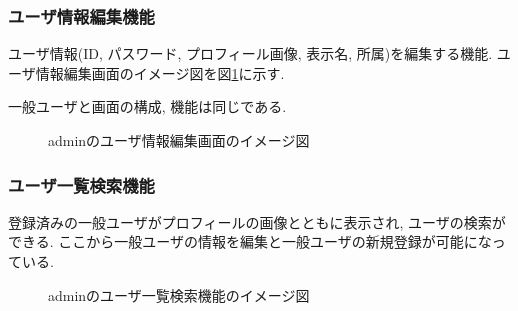 \documentclass[11ptm]{jsarticle}
\begin{document}
\clearpage
\subsubsection{ユーザ情報編集機能}
\label{subsubsec:ユーザ情報編集機能(admin)}
ユーザ情報(ID, パスワード, プロフィール画像, 表示名, 所属)を編集する機能. ユーザ情報編集画面のイメージ図を図\ref{fig:adminのユーザ情報編集画面のイメージ図}に示す. \par
一般ユーザと画面の構成, 機能は同じである.
\begin{figure}[h]
  \centering
  \caption{\label{fig:adminのユーザ情報編集画面のイメージ図}adminのユーザ情報編集画面のイメージ図}
\end{figure}

\clearpage
\subsubsection{ユーザ一覧検索機能}
\label{subsubsec:ユーザ一覧検索機能}
登録済みの一般ユーザがプロフィールの画像とともに表示され, ユーザの検索ができる. ここから一般ユーザの情報を編集と一般ユーザの新規登録が可能になっている.
\begin{figure}[h]
  \centering
  \caption{\label{fig:adminのユーザ一覧検索機能のイメージ図}adminのユーザ一覧検索機能のイメージ図}
\end{figure}
\end{document}
